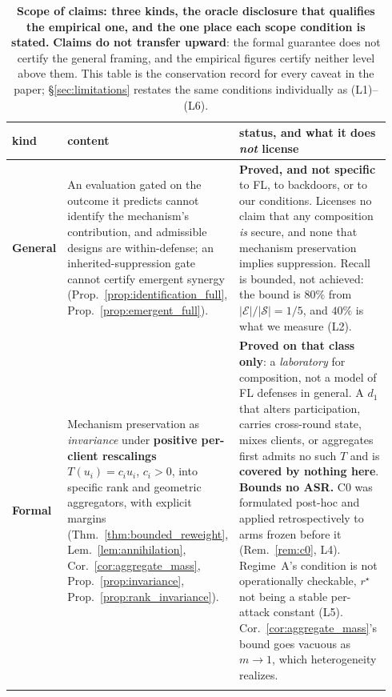 \documentclass{article}
\begin{document}
\begin{table}[htbp]
\centering\small
\caption{\textbf{Scope of claims: three kinds, the oracle disclosure that qualifies the empirical one, and the one place each scope condition is stated.} \textbf{Claims do not transfer upward}: the formal guarantee does not certify the general framing, and the empirical figures certify neither level above them. This table is the conservation record for every caveat in the paper; §\ref{sec:limitations} restates the same conditions individually as (L1)--(L6).}
\label{tab:scope_levels}
\begin{tabular}{@{}p{0.115\linewidth}p{0.315\linewidth}p{0.505\linewidth}@{}}
\toprule
\textbf{kind} & \textbf{content} & \textbf{status, and what it does \emph{not} license} \\
\midrule
\textbf{General} & An evaluation gated on the outcome it predicts cannot identify the mechanism's contribution, and admissible designs are within-defense; an inherited-suppression gate cannot certify emergent synergy (Prop.~\ref{prop:identification_full}, Prop.~\ref{prop:emergent_full}). & \textbf{Proved, and not specific} to FL, to backdoors, or to our conditions. Licenses no claim that any composition \emph{is} secure, and none that mechanism preservation implies suppression. Recall is bounded, not achieved: the bound is $80\%$ from $|\mathcal{E}|/|\mathcal{S}|{=}1/5$, and $40\%$ is what we measure (L2). \\
\addlinespace
\textbf{Formal} & Mechanism preservation as \emph{invariance} under \textbf{positive per-client rescalings} $T(u_i)=c_iu_i$, $c_i>0$, into specific rank and geometric aggregators, with explicit margins (Thm.~\ref{thm:bounded_reweight}, Lem.~\ref{lem:annihilation}, Cor.~\ref{cor:aggregate_mass}, Prop.~\ref{prop:invariance}, Prop.~\ref{prop:rank_invariance}). & \textbf{Proved on that class only}: a \emph{laboratory} for composition, not a model of FL defenses in general. A $d_1$ that alters participation, carries cross-round state, mixes clients, or aggregates first admits no such $T$ and is \textbf{covered by nothing here}. \textbf{Bounds no ASR.} C0 was formulated post-hoc and applied retrospectively to arms frozen before it (Rem.~\ref{rem:c0}, L4). Regime~A's condition is not operationally checkable, $r^\star$ not being a stable per-attack constant (L5). Cor.~\ref{cor:aggregate_mass}'s bound goes vacuous as $m \to 1$, which heterogeneity realizes. \\
\addlinespace

\end{tabular}
\end{table}
\end{document}
